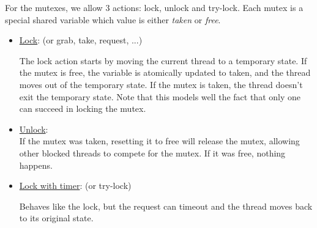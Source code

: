 \bigskip\noindent%
For the mutexes, we allow 3 actions: lock, unlock and try-lock. Each
mutex is a special shared variable which value is either \emph{taken}
or \emph{free}.
\begin{itemize}
\item \underline{Lock}: (or grab, take, request, ...) \\%
  \begin{minipage}{0.6\linewidth}
    The lock action starts by moving the current thread to a temporary
    state. If the mutex is free, the variable is atomically updated to
    taken, and the thread moves out of the temporary state. If the
    mutex is taken, the thread doesn't exit the temporary state. Note
    that this models well the fact that only one can succeed in
    locking the mutex.
  \end{minipage}
  \begin{minipage}{0.4\linewidth}
    \begin{center}
    \end{center}
  \end{minipage}
\item \underline{Unlock}:\\%
  If the mutex was taken, resetting it to free will release the mutex,
  allowing other blocked threads to compete for the mutex. If it was
  free, nothing happens.
\item \underline{Lock with timer}: (or try-lock) \\%
  \begin{minipage}{0.6\linewidth}
    Behaves like the lock, but the request can timeout and the thread
    moves back to its original state.
  \end{minipage}
  \begin{minipage}{0.4\linewidth}
    \begin{center}
\end{center}
\end{minipage}
\end{itemize}
